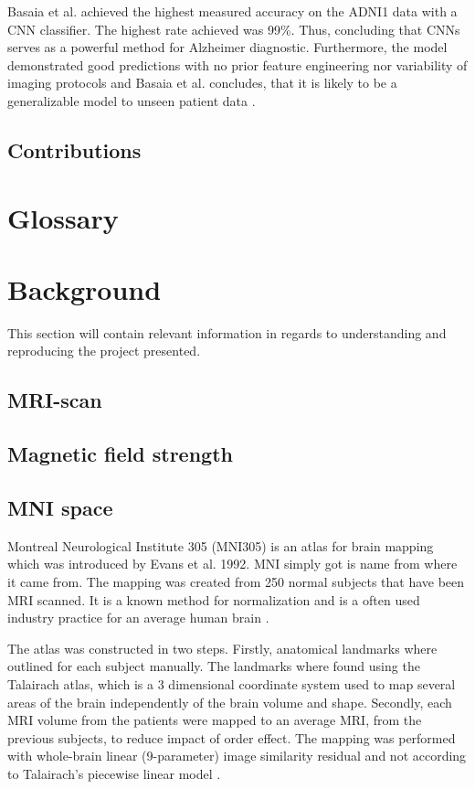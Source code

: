 \documentclass[12pt, fleqn, titlepage]{article}
\begin{document}
Basaia et al. achieved the highest measured accuracy on the ADNI1 data with a CNN classifier. The highest rate achieved was 99\%. Thus, concluding that CNNs serves as a powerful method for Alzheimer diagnostic. Furthermore, the model demonstrated good predictions with no prior feature engineering nor variability of imaging protocols and Basaia et al. concludes, that it is likely to be a generalizable model to unseen patient data \cite{neuro}. 

\subsection{Contributions}

\section{Glossary}

\section{Background}

This section will contain relevant information in regards to understanding and reproducing the project presented. 

\subsection{MRI-scan}


\subsection{Magnetic field strength}

\subsection{MNI space}
Montreal Neurological Institute 305 (MNI305) is an atlas for brain mapping which was introduced by Evans et al. 1992. MNI simply got is name from where it came from. The mapping was created from 250 normal subjects that have been MRI scanned. It is a known method for normalization and is a often used industry practice for an average human brain  \cite{evans}. 

The atlas was constructed in two steps. Firstly, anatomical landmarks where outlined for each subject manually. The landmarks where found using the Talairach atlas, which is a 3 dimensional coordinate system used to map several areas of the brain independently of the brain volume and shape. Secondly, each MRI volume from the patients were mapped to an average MRI, from the previous subjects, to reduce impact of order effect. The mapping was performed with whole-brain linear (9-parameter) image similarity residual and not according to Talairach's piecewise linear model \cite{collins}. 
\end{document}
